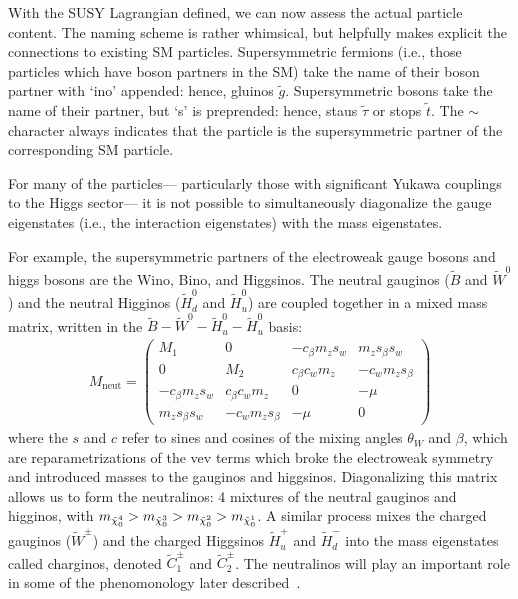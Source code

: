With the SUSY Lagrangian defined, we can now assess the actual particle content. The naming scheme is rather whimsical, but helpfully makes explicit the connections to existing SM particles. Supersymmetric fermions (i.e., those particles which have boson partners in the SM) take the name of their boson partner with `ino' appended: hence, gluinos $\tilde{g}$. Supersymmetric bosons take the name of their partner, but `s' is preprended: hence, staus $\tilde{\tau}$ or stops $\tilde{t}$. The $\sim$ character always indicates that the particle is the supersymmetric partner of the corresponding SM particle.

For many of the particles--- particularly those with significant Yukawa couplings to the Higgs sector--- it is not possible to simultaneously diagonalize the gauge eigenstates (i.e., the interaction eigenstates) with the mass eigenstates. 

For example, the supersymmetric partners of the electroweak gauge bosons and higgs bosons are the Wino, Bino, and Higgsinos. The neutral gauginos ($\tilde{B}$ and $\tilde{W}^0$) and the neutral Higginos ($\tilde{H}^0_d$ and $\tilde{H}^0_u$) are coupled together in a mixed mass matrix,  written in the $\tilde{B}-\tilde{W}^0-\tilde{H}_u^0-\tilde{H}_u^0$ basis\cite{Martin1997}:
\begin{align}
  M_\mathrm{neut}=
\left(
\begin{array}{cccc}
 M_1 & 0 & -c_{\beta } m_z s_w &
   m_z s_{\beta } s_w \\
 0 & M_2 & c_{\beta } c_w m_z &
   -c_w m_z s_{\beta } \\
 -c_{\beta } m_z s_w & c_{\beta }
   c_w m_z & 0 & -\mu  \\
 m_z s_{\beta } s_w & -c_w m_z
   s_{\beta } & -\mu  & 0
\end{array}
\right)  \label{eqn:massx}
\end{align}
%
where the $s$ and $c$ refer to sines and cosines of the mixing angles $\theta_W$ and $\beta$, which are reparametrizations of the vev terms which broke the electroweak symmetry and introduced masses to the gauginos and higgsinos. Diagonalizing this matrix allows us to form the neutralinos: 4 mixtures of the neutral gauginos and higginos, with $m_{\tilde{\chi}_0^4} > m_{\tilde{\chi}_0^3} > m_{\tilde{\chi}_0^2} > m_{\tilde{\chi}_0^1}$. A similar process mixes the charged gauginos ($\tilde{W}^\pm$) and the charged Higgsinos $\tilde{H}^+_u$ and $\tilde{H}^-_d$ into the mass eigenstates called charginos, denoted $\tilde{C}^\pm_1$ and $\tilde{C}^\pm_2$. The neutralinos will play an important role in some of the phenomonology later described~\cite{Martin1997}.

